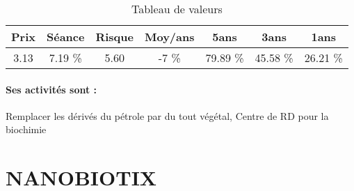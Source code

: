 \documentclass[11pt,a4paper]{report}%
\begin{document}
\begin{table}[H]
  \centering
    \begin{tabular}{|c|c|c|c|c|c|c|}
    \hline
    Prix & Séance & Risque  & Moy/ans & 5ans & 3ans & 1ans \\
    \hline
    3.13 &    7.19 \%    & 5.60 & -7 \% & 79.89 \% & 45.58 \% & 26.21 \% \\
    \hline
    \end{tabular}%
        \label{tab:table_METABOLIC EXPLORER}%
      \caption{Tableau de valeurs}
\end{table}%

\paragraph{Ses activités sont : } Remplacer les dérivés du pétrole par du tout végétal, Centre de RD pour la biochimie 
    
    \newpage

\section{NANOBIOTIX}
\end{document}
